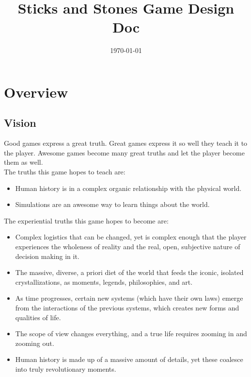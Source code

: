\documentclass[11pt]{article}
\date{\today}
\title{Sticks and Stones Game Design Doc}
\begin{document}
\maketitle
\tableofcontents

\section{Overview}
\label{sec:org5fb959e}
\subsection{Vision}
\label{sec:org3926264}
Good games express a great truth. Great games express it so well they teach it to the player. Awesome games become many great truths and let the player become them as well.\\

The truths this game hopes to teach are:\\
\begin{itemize}
\item Human history is in a complex organic relationship with the physical world.\\
\item Simulations are an awesome way to learn things about the world.\\
\end{itemize}

The experiential truths this game hopes to become are:\\
\begin{itemize}
\item Complex logistics that can be changed, yet is complex enough that the player experiences the wholeness of reality and the real, open, subjective nature of decision making in it.\\
\item The massive, diverse, a priori diet of the world that feeds the iconic, isolated crystallizations, as moments, legends, philosophies, and art.\\
\item As time progresses, certain new systems (which have their own laws) emerge from the interactions of the previous systems, which creates new forms and qualities of life.\\
\item The scope of view changes everything, and a true life requires zooming in and zooming out.\\
\item Human history is made up of a massive amount of details, yet these coalesce into truly revolutionary moments.\\
\end{itemize}
\end{document}
